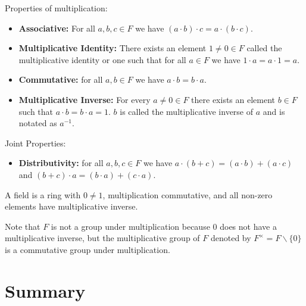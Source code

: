 \documentclass[12pt]{article}
\begin{document}
Properties of multiplication:
\begin{itemize}
\item{\textbf{Associative:} For all $a, b, c \in F$ we have $(a\cdot b)\cdot c = a\cdot(b\cdot c)$.}
\item{\textbf{Multiplicative Identity:} There exists an element $1\neq 0\in F$ called the multiplicative identity or one such that for all $a\in F$ we have $1\cdot a = a \cdot 1 = a$.}
\item{\textbf{Commutative:} for all $a, b \in F$ we have $a\cdot b = b \cdot a$.}
\item{\textbf{Multiplicative Inverse:} For every $a \neq 0 \in F$ there exists an element $b\in F$ such that $a\cdot b = b\cdot a = 1$. $b$ is called the multiplicative inverse of $a$ and is notated as $a^{-1}$.}
\end{itemize}

Joint Properties:
\begin{itemize}
\item{\textbf{Distributivity:} for all $a, b, c \in F$ we have $a\cdot(b+c)= (a\cdot b) + (a\cdot c)$ and $(b+c)\cdot a = (b\cdot a) + (c\cdot a)$.}
\end{itemize}

A field is a ring with $0\neq 1$, multiplication commutative, and all non-zero elements have multiplicative inverse.

Note that $F$ is not a group under multiplication because $0$ does not have a multiplicative inverse, but the multiplicative group of $F$ denoted by $F^{\times} = F\backslash \{0\}$ is a commutative group under multiplication.




\section{Summary}
\end{document}
